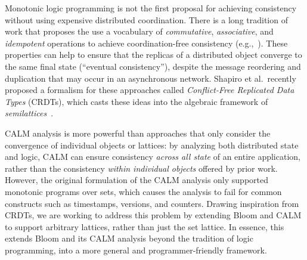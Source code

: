 Monotonic logic programming is not the first proposal for achieving consistency without using expensive distributed coordination.  There is a long tradition of work that proposes the use a vocabulary of \emph{commutative},
\emph{associative}, and \emph{idempotent} operations to achieve coordination-free consistency
(e.g.,~\cite{dynamo,quicksand,Reiher1994,bayou}). These properties can help to ensure that the
replicas of a distributed object converge to the same final state (``eventual
consistency''), despite the message reordering and duplication that may occur in
an asynchronous network. Shapiro et al.\ recently proposed a formalism for these
approaches called \emph{Conflict-Free Replicated Data Types} (CRDTs), which
casts these ideas into the algebraic framework of
\emph{semilattices}~\cite{Shapiro2011a,Shapiro2011b}.

CALM analysis is more powerful than approaches that only consider the
convergence of individual objects or lattices: by analyzing both distributed
state and logic, CALM can ensure consistency \emph{across all state} of an
entire application, rather than the consistency \emph{within individual objects}
offered by prior work. However, the original formulation of the CALM analysis
only supported monotonic programs over sets, which causes the analysis to fail
for common constructs such as timestamps, versions, and counters. Drawing
inspiration from CRDTs, we are working to address this problem by extending
Bloom and CALM to support arbitrary lattices, rather than just the set lattice.
In essence, this extends Bloom and its CALM analysis beyond the tradition of
logic programming, into a more general and programmer-friendly framework.

